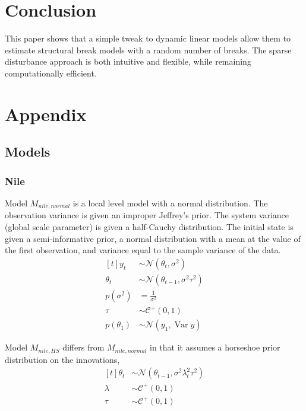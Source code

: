 \documentclass{article}
\newcommand{\dist}[1]{\mathcal{#1}}
\newcommand{\paren}[1]{\ensuremath{\left(#1\right)}}
\newcommand{\dnorm}[1]{\ensuremath{\dist{N}\paren{#1}}}
\newcommand{\dhalfcauchy}[1]{\ensuremath{\dist{C}^{+}\paren{#1}}}
\DeclareMathOperator{\Var}{Var}
\begin{document}
\section{Conclusion}
\label{sec:conclusion}

This paper shows that a simple tweak to dynamic linear models allow them to estimate structural break models with a random number of breaks.
The sparse disturbance approach is both intuitive and flexible, while remaining computationally efficient.

\clearpage{}
\section{Appendix}
\label{sec:appendix}

\subsection{Models}
\label{sec:models}

\subsubsection{Nile}
\label{sec:nile-1}

Model $M_{nile,normal}$ is a local level model with a normal distribution.
The observation variance is given an improper Jeffrey's prior.
The system variance (global scale parameter) is given a half-Cauchy distribution. 
The initial state is given a semi-informative prior, a normal distribution with a mean at the value of the first observation, and variance equal to the sample variance of the data.
\begin{equation}
  \label{eq:11}
  \begin{aligned}[t]
    y_{t} &\sim \dnorm{\theta_{t}, \sigma^{2}} \\
    \theta_{t} &\sim \dnorm{\theta_{t - 1}, \sigma^{2} \tau^{2}} \\
    p(\sigma^{2}) &= \frac{1}{\sigma^{2}} \\
    \tau &\sim \dhalfcauchy{0, 1} \\
    p(\theta_{1}) &\sim \dnorm{y_{1}, \Var{y}}
  \end{aligned}
\end{equation}

Model $M_{nile,HS}$ differs from $M_{nile,normal}$ in that it assumes a horseshoe prior distribution on 
the innovations,
\begin{equation}
  \label{eq:18}
  \begin{aligned}[t]
    \theta_{t} &\sim \dnorm{\theta_{t - 1}, \sigma^{2} \lambda_{t}^{2} \tau^{2}} \\
    \lambda &\sim \dhalfcauchy{0, 1} \\
    \tau &\sim \dhalfcauchy{0, 1}
  \end{aligned}
\end{equation}
\end{document}
